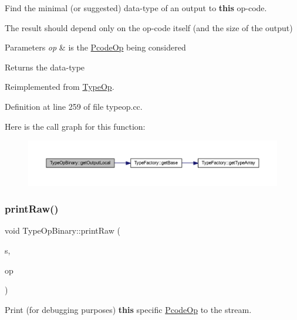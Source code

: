 Find the minimal (or suggested) data-\/type of an output to {\bfseries{this}} op-\/code. 

The result should depend only on the op-\/code itself (and the size of the output) 
\begin{DoxyParams}{Parameters}
{\em op} & is the \mbox{\hyperlink{class_pcode_op}{Pcode\+Op}} being considered \\
\hline
\end{DoxyParams}
\begin{DoxyReturn}{Returns}
the data-\/type 
\end{DoxyReturn}


Reimplemented from \mbox{\hyperlink{class_type_op_a3454cadfb15f6794829123a7ecfe38f5}{Type\+Op}}.



Definition at line 259 of file typeop.\+cc.

Here is the call graph for this function\+:
\nopagebreak
\begin{figure}[H]
\begin{center}
\leavevmode
\includegraphics[width=350pt]{class_type_op_binary_a183a65ebb3716a380229e38c3383fd98_cgraph}
\end{center}
\end{figure}
\mbox{\label{class_type_op_binary_a3f26fc1e6bc1d143fb4f8391ef7ff3d6}} 
\subsubsection{\texorpdfstring{printRaw()}{printRaw()}}
{\footnotesize\ttfamily void Type\+Op\+Binary\+::print\+Raw (\begin{DoxyParamCaption}\item[{ostream \&}]{s,  }\item[{const \mbox{\hyperlink{class_pcode_op}{Pcode\+Op}} $\ast$}]{op }\end{DoxyParamCaption})\hspace{0.3cm}{\ttfamily [virtual]}}



Print (for debugging purposes) {\bfseries{this}} specific \mbox{\hyperlink{class_pcode_op}{Pcode\+Op}} to the stream. 


